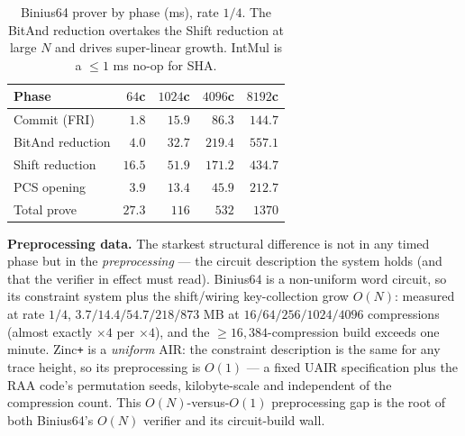 \begin{table}[h]
\centering
\renewcommand{\arraystretch}{1.2}
\begin{tabular}{l r r r r}
\toprule
Phase & $64$c & $1024$c & $4096$c & $8192$c \\
\midrule
Commit (FRI)        & $1.8$  & $15.9$ & $86.3$  & $144.7$ \\
BitAnd reduction    & $4.0$  & $32.7$ & $219.4$ & $557.1$ \\
Shift reduction     & $16.5$ & $51.9$ & $171.2$ & $434.7$ \\
PCS opening         & $3.9$  & $13.4$ & $45.9$  & $212.7$ \\
\midrule
Total prove         & $27.3$ & $116$  & $532$   & $1370$ \\
\bottomrule
\end{tabular}
\caption{Binius64 prover by phase (ms), rate $1/4$. The BitAnd reduction
overtakes the Shift reduction at large $N$ and drives super-linear growth.
IntMul is a $\le\!1$ ms no-op for SHA.}
\label{tab:perphase-b64}
\end{table}

\medskip
\noindent\textbf{Preprocessing data.} The starkest structural difference is
not in any timed phase but in the \emph{preprocessing} --- the circuit
description the system holds (and that the verifier in effect must read).
Binius64 is a non-uniform word circuit, so its constraint system plus the
shift/wiring key-collection grow $O(N)$: measured at rate $1/4$,
$3.7 / 14.4 / 54.7 / 218 / 873$ MB at $16 / 64 / 256 / 1024 / 4096$
compressions (almost exactly $\times4$ per $\times4$), and the
$\ge\!16{,}384$-compression build exceeds one minute. Zinc\texttt{+} is a
\emph{uniform} AIR: the constraint description is the same for any trace
height, so its preprocessing is $O(1)$ --- a fixed UAIR specification plus the
RAA code's permutation seeds, kilobyte-scale and independent of the
compression count. This $O(N)$-versus-$O(1)$ preprocessing gap is the root of
both Binius64's $O(N)$ verifier and its circuit-build wall.

